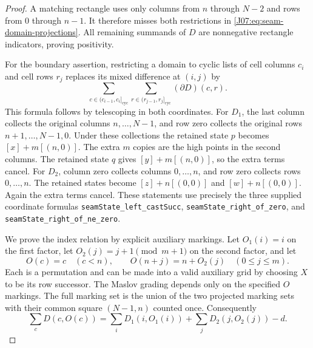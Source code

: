 \documentclass[11pt,oneside]{report}
\theoremstyle{definition}
\numberwithin{equation}{section}
\newcommand{\decl}[1]{\textnormal{\nolinkurl{#1}}}
\begin{document}
\begin{proof}
A matching rectangle uses only columns from $n$ through $N-2$ and
rows from $0$ through $n-1$. It therefore misses both restrictions in
\eqref{J07:eq:seam-domain-projections}. All remaining summands of $D$ are
nonnegative rectangle indicators, proving positivity.

For the boundary assertion, restricting a domain to cyclic lists of
cell columns $c_i$ and cell rows $r_j$ replaces its mixed difference
at $(i,j)$ by
\[
 \sum_{c\in(c_{i-1},c_i]_{\mathrm{cyc}}}
 \sum_{r\in(r_{j-1},r_j]_{\mathrm{cyc}}}(\partial D)(c,r).
\]
This formula follows by telescoping in both coordinates.
For $D_1$, the last column collects the original columns
$n,\ldots,N-1$, and row zero collects the original rows
$n+1,\ldots,N-1,0$. Under these collections the retained state $p$
becomes $[x]+m[(n,0)]$. The extra $m$ copies are the high points in
the second columns. The retained state $q$ gives
$[y]+m[(n,0)]$, so the extra terms cancel.
For $D_2$, column zero collects columns $0,\ldots,n$, and row zero
collects rows $0,\ldots,n$. The retained states become
$[z]+n[(0,0)]$ and $[w]+n[(0,0)]$. Again the extra terms cancel.
These statements use precisely the three supplied coordinate formulas
\decl{seamState_left_castSucc}, \decl{seamState_right_of_zero}, and
\decl{seamState_right_of_ne_zero}.

We prove the index relation by explicit auxiliary markings.
Let $O_1(i)=i$ on the first factor, let
$O_2(j)=j+1\pmod{m+1}$ on the second factor, and let
\[
 O(c)=c\quad(c<n),\qquad
 O(n+j)=n+O_2(j)\quad(0\le j\le m).
\]
Each is a permutation and can be made into a valid auxiliary grid by
choosing $X$ to be its row successor. The Maslov grading depends only on
the specified $O$ markings. The full marking set is the union of the
two projected marking sets with their common square $(N-1,n)$ counted
once. Consequently
\begin{equation}\label{J07:eq:seam-marking-domain-count}
 \sum_c D(c,O(c))=
 \sum_iD_1(i,O_1(i))+\sum_jD_2(j,O_2(j))-d.
\end{equation}


\end{proof}
\end{document}
